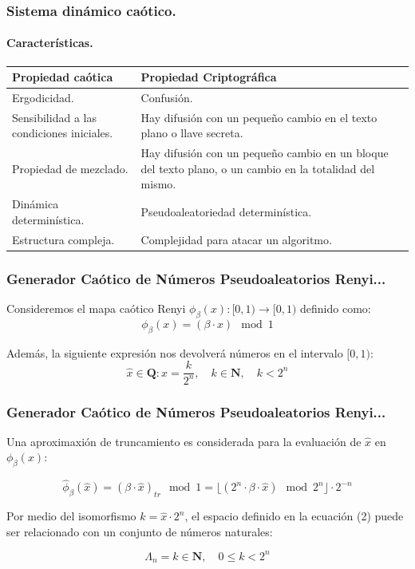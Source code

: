 \documentclass[xcolor=table]{beamer}
\begin{document}
\begin{frame}
\frametitle{Sistema dinámico caótico.}
\framesubtitle{Características.}

\small
\begin{table}[h]
\centering
\begin{tabular}{|l|p{5cm} |}
\hline
\cellcolor{blue!25}Propiedad caótica &\cellcolor{blue!25}Propiedad Criptográfica \\   \hline
Ergodicidad. & Confusión. \\ \hline
Sensibilidad a las condiciones iniciales. & Hay difusión con un pequeño cambio en el texto plano o llave secreta.  \\ \hline
Propiedad de mezclado. & Hay difusión con un pequeño cambio en un bloque del texto plano, o un cambio en la totalidad del mismo.\\ \hline
Dinámica determinística. & Pseudoaleatoriedad determinística. \\ \hline
Estructura compleja. & Complejidad para atacar un algoritmo.\\ \hline
\end{tabular} 
\end{table}
\end{frame}



\begin{frame}
\frametitle{Generador Caótico de Números Pseudoaleatorios Renyi...}

Consideremos el mapa caótico Renyi $\phi_{\beta}(x): [0,1)\longrightarrow [0,1)$ definido como:
\begin{equation}
\phi_{\beta}(x)= (\beta \cdot x) \mod 1
\end{equation}

Además, la siguiente expresión nos devolverá números en el intervalo $[0,1)$:
\begin{equation}
\hat{x} \in \mathbf{Q}: \hat{x}= \frac{k}{2^{n}}, \quad k \in \mathbf{N}, \quad k< 2^{n}
\end{equation}
\end{frame}



\begin{frame}
\frametitle{Generador Caótico de Números Pseudoaleatorios Renyi...}

Una aproximaxión de truncamiento es considerada para la evaluación de $\hat{x}$ en $\phi_{\beta}(x)$:

\begin{equation}
 \hat{\phi} _{\beta}(\hat{x})= (\beta \cdot  \hat{x})_{tr} \mod 1 = \lfloor (2^{n} \cdot \beta \cdot \hat{x}) \mod 2^{n}  \rfloor \cdot 2^{-n}
\end{equation}

Por medio del isomorfismo $k = \hat{x}\cdot 2^{n}$, el espacio definido en la ecuación (2) puede ser relacionado con un conjunto de números naturales:

\begin{equation}
\Lambda _{n}= { k \in \mathbf{N} }, \quad 0 \leq k < 2^{n}
\end{equation}
\end{frame}
\end{document}
